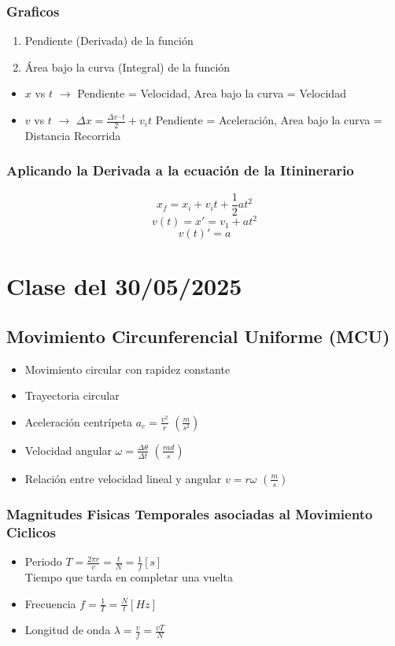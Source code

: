 \documentclass[11pt]{article}
\begin{document}
\subsubsection{Graficos}
\begin{enumerate}
	\item Pendiente (Derivada) de la función
	\item Área bajo la curva (Integral) de la función
\end{enumerate}
\begin{itemize}
	\item $x$ vs $t$ $\rightarrow$ Pendiente = Velocidad, Area bajo la curva = Velocidad
	\item $v$ vs $t$ $\rightarrow$ $\Delta{x}=\frac{\Delta{v} \cdot t}{2}+v_i t$ Pendiente = Aceleración, Area bajo la curva = Distancia Recorrida
\end{itemize}

\subsubsection{Aplicando la Derivada a la ecuación de la Itininerario}
\[x_f=x_i+v_i t+\frac{1}{2}at^2 \]
\[v(t)=x'=v_1+at^2 \]
\[v(t)'=a \]




\section{Clase del 30/05/2025}
\subsection{Movimiento Circunferencial Uniforme (MCU)}
\begin{itemize}
	\item Movimiento circular con rapidez constante
	\item Trayectoria circular
	\item Aceleración centrípeta $a_c = \frac{v^2}{r}$ $(\frac{m}{s^2})$
	\item Velocidad angular $\omega = \frac{\Delta \theta}{\Delta t}$ $(\frac{rad}{s})$
	\item Relación entre velocidad lineal y angular $v = r\omega$ $(\frac{m}{s})$
\end{itemize}
\subsubsection{Magnitudes Fisicas Temporales asociadas al Movimiento Ciclicos}
\begin{itemize}
	\item Periodo $T = \frac{2\pi r}{v} = \frac{t}{N} = \frac{1}{f} [s]$ \\
	      Tiempo que tarda en completar una vuelta
	\item Frecuencia $f = \frac{1}{T} = \frac{N}{t} [Hz]$
	\item Longitud de onda $\lambda = \frac{v}{f} = \frac{vT}{N}$
\end{itemize}
\end{document}
